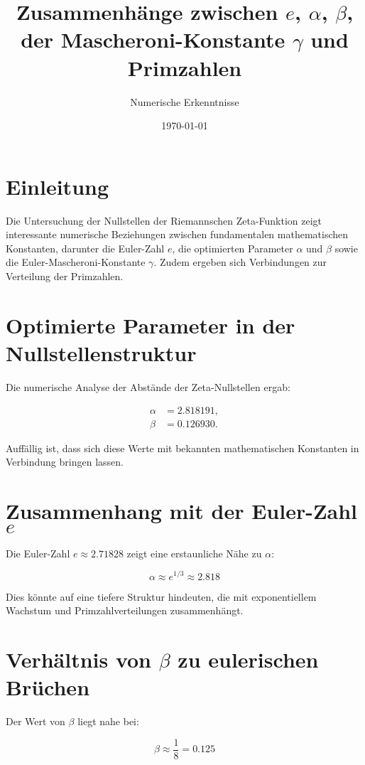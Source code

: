\documentclass[a4paper,12pt]{article}
\title{Zusammenhänge zwischen \( e \), \( \alpha \), \( \beta \), der Mascheroni-Konstante \( \gamma \) und Primzahlen}
\author{Numerische Erkenntnisse}
\date{\today}
\begin{document}
\maketitle

\section{Einleitung}
Die Untersuchung der Nullstellen der Riemannschen Zeta-Funktion zeigt interessante numerische Beziehungen zwischen fundamentalen mathematischen Konstanten, darunter die Euler-Zahl \( e \), die optimierten Parameter \( \alpha \) und \( \beta \) sowie die Euler-Mascheroni-Konstante \( \gamma \). Zudem ergeben sich Verbindungen zur Verteilung der Primzahlen.

\section{Optimierte Parameter in der Nullstellenstruktur}
Die numerische Analyse der Abstände der Zeta-Nullstellen ergab:

\begin{align}
\alpha &= 2.818191, \\
\beta &= 0.126930.
\end{align}

Auffällig ist, dass sich diese Werte mit bekannten mathematischen Konstanten in Verbindung bringen lassen.

\section{Zusammenhang mit der Euler-Zahl \( e \)}
Die Euler-Zahl \( e \approx 2.71828 \) zeigt eine erstaunliche Nähe zu \( \alpha \):

\begin{equation}
\alpha \approx e^{1/3} \approx 2.818
\end{equation}

Dies könnte auf eine tiefere Struktur hindeuten, die mit exponentiellem Wachstum und Primzahlverteilungen zusammenhängt.

\section{Verhältnis von \( \beta \) zu eulerischen Brüchen}
Der Wert von \( \beta \) liegt nahe bei:

\begin{equation}
\beta \approx \frac{1}{8} = 0.125
\end{equation}
\end{document}

